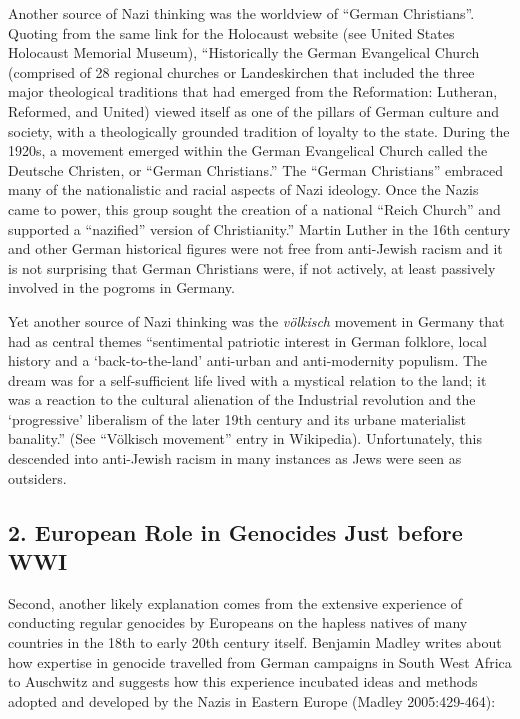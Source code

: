 Another source of Nazi thinking was the worldview of “German Christians”. Quoting from the same link for the Holocaust website (see United States Holocaust Memorial Museum), “Historically the German Evangelical Church (comprised of 28 regional churches or Landeskirchen that included the three major theological traditions that had emerged from the Reformation: Lutheran, Reformed, and United) viewed itself as one of the pillars of German culture and society, with a theologically grounded tradition of loyalty to the state. During the 1920s, a movement emerged within the German Evangelical Church called the Deutsche Christen, or “German Christians.” The “German Christians” embraced many of the nationalistic and racial aspects of Nazi ideology. Once the Nazis came to power, this group sought the creation of a national “Reich Church” and supported a “nazified” version of Christianity.” Martin Luther in the 16th century and other German historical figures were not free from anti-Jewish racism and it is not surprising that German Christians were, if not actively, at least passively involved in the pogroms in Germany.

Yet another source of Nazi thinking was the {\sl völkisch} movement in Germany that had as central themes “sentimental patriotic interest in German folklore, local history and a ‘back-to-the-land’ anti-urban and anti-modernity populism. The dream was for a self-sufficient life lived with a mystical relation to the land; it was a reaction to the cultural alienation of the Industrial revolution and the ‘progressive’ liberalism of the later 19th century and its urbane materialist banality.” (See “Völkisch movement” entry in Wikipedia). Unfortunately, this descended into anti-Jewish racism in many instances as Jews were seen as outsiders.

\subsection*{2. European Role in Genocides Just before WWI}

Second, another likely explanation comes from the extensive experience of conducting regular genocides by Europeans on the hapless natives of many countries in the 18th to early 20th century itself. Benjamin Madley writes about how expertise in genocide travelled from German campaigns in South West Africa to Auschwitz and suggests how this experience incubated ideas and methods adopted and developed by the Nazis in Eastern Europe (Madley 2005:429-464):

